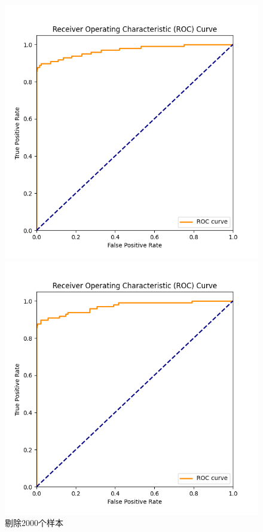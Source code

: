 \documentclass[8pt]{article}
\begin{document}
\begin{figure}[H]
    \centering
    \begin{minipage}{0.24\textwidth}
        \centering
        \includegraphics[width=\textwidth]{../Prob1/out/rand_seed_14/task2/roc_curve_remove2000.png}
        \caption{剔除2000个样本}
        \label{fig:roc_curve_remove2000}
    \end{minipage}
    \hfill
    \begin{minipage}{0.24\textwidth}
        \centering
        \includegraphics[width=\textwidth]{../Prob1/out/rand_seed_14/task2/roc_curve_remove20000.png}

\end{minipage}
\end{figure}
\end{document}
